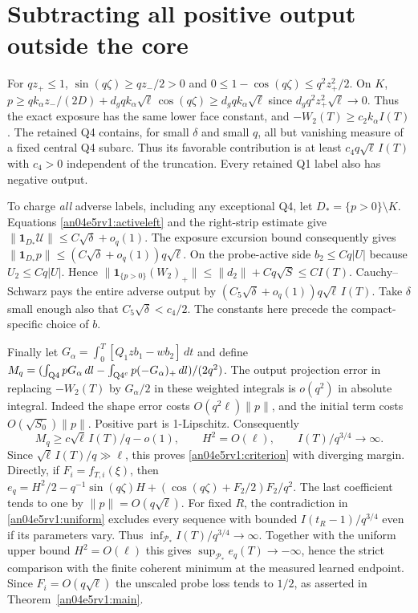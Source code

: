 \documentclass[11pt]{article}
\newcommand{\dd}{\,dl}
\newcommand{\dt}{\,dt}
\newcommand{\norm}[1]{\lVert #1\rVert}
\begin{document}
\section{Subtracting all positive output outside the core}\label{an04e5rv1:endpoint}
For $qz_+\le1$, $\sin(q\zeta)\ge qz_-/2>0$ and $0\le1-\cos(q\zeta)\le q^2 z_+^2/2$. On $K$, $p\ge qk_\alpha z_-/(2D)+d_gq k_\alpha\sqrt\ell\,\cos(q\zeta)\ge d_g q k_\alpha\sqrt\ell$ since $d_g q^2 z_+^2\sqrt\ell\to0$. Thus the exact exposure has the same lower face constant, and
$-W_2(T)\ge c_2 k_\alpha I(T)$. The retained Q4 contains, for small
$\delta$ and small $q$, all but vanishing measure of a fixed central
Q4 subarc. Thus its favorable contribution is at least
$c_4 q\sqrt\ell\,I(T)$ with $c_4>0$ independent of the truncation.
Every retained Q1 label also has negative output.

To charge \emph{all} adverse labels, including any exceptional Q4,
let $D_*=\{p>0\}\setminus K$. Equations \eqref{an04e5rv1:activeleft} and
the right-strip estimate give
$\norm{\mathbf1_{D_*}\mathcal U}\le C\sqrt\delta+o_q(1)$.
The exposure excursion bound consequently gives
$\norm{\mathbf1_{D_*}p}\le(C\sqrt\delta+o_q(1))q\sqrt\ell$.
On the probe-active side $b_2\le Cq|U|$ because $U_2\le Cq|U|$.
Hence $\norm{\mathbf1_{\{p>0\}}(W_2)_+}\le\norm{d_2}+Cq\sqrt S
\le C I(T)$. Cauchy--Schwarz pays the entire adverse output by
$(C_5\sqrt\delta+o_q(1))q\sqrt\ell\,I(T)$.
Take $\delta$ small enough also that $C_5\sqrt\delta<c_4/2$.
The constants here precede the compact-specific choice of $b$.

Finally let $G_\alpha=\int_0^T[Q_1zb_1-w b_2]\dt$ and define
$M_q=(\int_{\rm Q4}pG_\alpha\dd-\int_{{\rm Q4}^c}p(-G_\alpha)_+\dd)/(2q^2)$.
The output projection error in replacing $-W_2(T)$ by $G_\alpha/2$
in these weighted integrals is $o(q^2)$ in absolute integral. Indeed
the shape error costs $O(q^2\ell)\norm p$, and the initial term costs
$O(\sqrt{S_0})\norm p$. Positive part is 1-Lipschitz. Consequently
\[
 M_q\ge c\sqrt\ell\, I(T)/q-o(1),\qquad
 H^2=O(\ell),\qquad I(T)/q^{3/4}\longrightarrow\infty .
\]
Since $\sqrt\ell\,I(T)/q\gg\ell$, this proves \eqref{an04e5rv1:criterion} with diverging margin. Directly, if
$F_i=f_{T,i}(\xi)$, then
$e_q=H^2/2-q^{-1}\sin(q\zeta)H+
(\cos(q\zeta)+F_2/2)F_2/q^2$.
The last coefficient tends to one by $\norm p=O(q\sqrt\ell)$.
For fixed $R$, the contradiction in \eqref{an04e5rv1:uniform} excludes every sequence with bounded $I(t_R-1)/q^{3/4}$ even if its parameters vary. Thus $\inf_{\mathcal P_*} I(T)/q^{3/4}\to\infty$. Together with the uniform upper bound $H^2=O(\ell)$ this gives $\sup_{\mathcal P_*}e_q(T)\to-\infty$, hence the strict comparison with
the finite coherent minimum at the measured learned endpoint. Since $F_i=O(q\sqrt\ell)$ the unscaled probe loss tends to $1/2$, as asserted in Theorem~\ref{an04e5rv1:main}.
\end{document}

